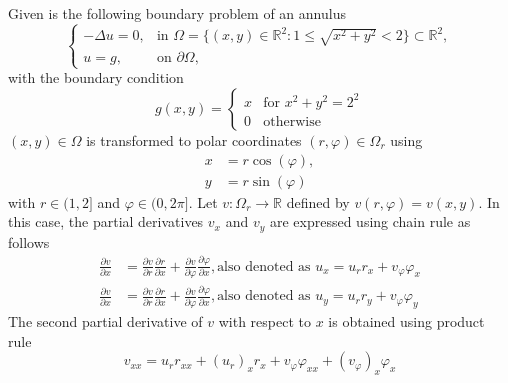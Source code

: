 \newcommand{\assignmentDate}{November 4th, 2019}




Given is the following boundary problem of an annulus
\begin{equation}
	\begin{cases}
		-\Delta u = 0, &\text{in } \Omega = \{(x,y) \in \mathbb{R}^2 \colon 1 \leq \sqrt{x^2 + y^2} < 2 \} \subset \mathbb{R}^2, \\
		u = g, &\text{on } \partial \Omega,
	\end{cases}
	\label{eq:annulus1}
\end{equation}
with the boundary condition
\begin{equation}
	g(x,y) = 
	\begin{cases}
		x &\text{for } x^2 +y^2 = 2^2\\
		0 &\text{otherwise}
	\end{cases}
\end{equation}
%
$(x,y) \in \Omega$ is transformed to polar coordinates $(r, \varphi) \in \Omega_r$ using
\begin{align}
	x &= r \cos{(\varphi)},\\
	y &= r \sin{(\varphi)}
\end{align}
with $r \in (1,2]$ and $\varphi \in (0, 2 \pi]$. Let $v:\Omega_r \to \mathbb{R}$ defined by $v(r,\varphi) = v(x,y)$.
In this case, the partial derivatives $v_x$ and $v_y$ are expressed using chain rule as follows
\begin{align}
	\label{eq:chainX}
	\frac{\partial v}{\partial x} &= \frac{\partial v}{\partial r} \frac{\partial r}{\partial x} +
									\frac{\partial v}{\partial \varphi} \frac{\partial \varphi}{\partial x}, \text{also denoted as } u_x = u_r r_x + v_\varphi \varphi_x\\
	\label{eq:chainY}
	\frac{\partial v}{\partial x} &= \frac{\partial v}{\partial r} \frac{\partial r}{\partial x} +
									\frac{\partial v}{\partial \varphi} \frac{\partial \varphi}{\partial x}, \text{also denoted as } u_y= u_r r_y + v_\varphi \varphi_y
\end{align}
%
The second partial derivative of $v$ with respect to $x$ is obtained using product rule
\begin{equation}
	v_{xx} = u_r r_{xx} + (u_r)_x r_x + v_\varphi \varphi_{xx} + (v_\varphi)_x \varphi_x
	\label{eq:uXX}
\end{equation}
